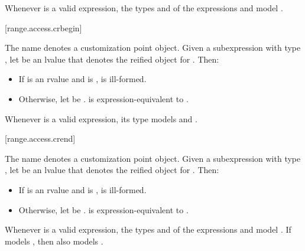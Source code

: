 \pnum
\begin{note}
Whenever  is a valid expression,
the types  and  of the expressions
 and 
model .
\end{note}

[range.access.crbegin]{}
%

\pnum
The name  denotes a customization point
object.
Given a subexpression  with type ,
let  be an lvalue that denotes the reified object for .
Then:
\begin{itemize}
\item
If  is an rvalue and
 is ,
 is ill-formed.
\item
Otherwise,
let  be .
 is expres\-sion-equivalent to
.
\end{itemize}

\pnum
\begin{note}
Whenever  is a valid expression, its
type models  and
.
\end{note}

[range.access.crend]{}
%

\pnum
The name  denotes a customization point
object.
Given a subexpression  with type ,
let  be an lvalue that denotes the reified object for .
Then:
\begin{itemize}
\item
If  is an rvalue and
 is ,
 is ill-formed.
\item
Otherwise,
let  be .
 is expression-equivalent to
.
\end{itemize}

\pnum
\begin{note}
Whenever  is a valid expression,
the types  and  of the expressions
 and 
model .
If  models ,
then  also models .
\end{note}


